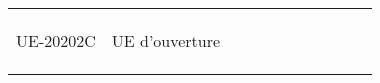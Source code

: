 \documentclass[a4paper,11pt]{article}
\begin{document}
{{\begin{tabular}{lllllllllll}
                               &                                                    &                           &                           &                           &                                    &                             &                             &                                    &                                  &                                  \\
                               &                                                    &                           &                           &                           &                                    &                             &                             &                                    &                                  &                                  \\
                               &                                                    &                           &                           &                           &                                    &                             &                             &                                    &                                  &                                  \\
\rowcolor[HTML]{C0C0C0} 
UE-20202C                      & UE d'ouverture                                     &                           &                           &                           &                                    &                             &                             &                                    &                                  &                                  \\
                               &                                                    &                           &                           &                           &                                    &                             &                             &                                    &                                  &                                  \\
                               &                                                    &                           &                           &                           &                                    &                             &                             &                                    &                                  &                                  \\
                               &                                                    &                           &                           &                           &                                    &                             &                             &                                    &                                  &                                  \\

\end{tabular}}}
\end{document}
